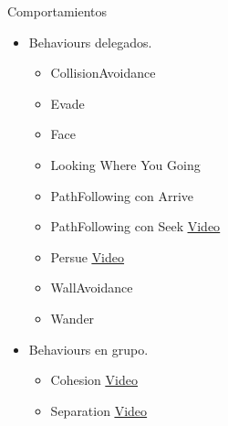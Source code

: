 \documentclass[10pt]{beamer}
\begin{document}
\begin{frame}{Comportamientos}
\begin{itemize}[<+- | alert@+>]
	\item Behaviours delegados.
 	\begin{itemize}[<+- | alert@+>]
  		\item CollisionAvoidance \item Evade \item Face \item Looking Where You Going \item PathFollowing con Arrive 
  		\item PathFollowing con Seek \href{videos/TestPathFollowingWithoutPathOffset.mp4}{\color{blue}\underline{Video}}
  		\item Persue \href{videos/TestPersue.mp4}{\color{blue}\underline{Video}}
  		\item WallAvoidance \item Wander 
 	\end{itemize}
 	\item Behaviours en grupo.
 	\begin{itemize}[<+- | alert@+>]
  		\item Cohesion \href{videos/TestCohesion.mp4}{\color{blue}\underline{Video}}
  		\item Separation \href{videos/TestSeparation.mp4}{\color{blue}\underline{Video}}
 	\end{itemize}
\end{itemize}
\end{frame}
\end{document}
